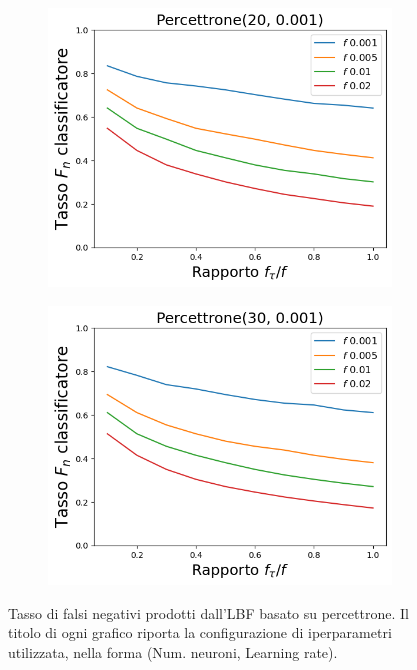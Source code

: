 \documentclass[../../main.tex]{subfiles}
\begin{document}
    \begin{figure}[H]
        \centering
        \begin{subfigure}[b]{0.49\textwidth}
            \centering
            \includegraphics[width = \textwidth]{immagini/7/LBF/Percettrone(20, 0.001)_FNR.png}
            \caption{}
            \label{fig:LBFFNRPercettrone20}
        \end{subfigure}
        \begin{subfigure}[b]{0.49\textwidth}
            \centering
            \includegraphics[width = \textwidth]{immagini/7/LBF/Percettrone(30, 0.001)_FNR.png}
            \caption{}
            \label{fig:LBFFNRPercettrone30}
        \end{subfigure}
        \caption{Tasso di falsi negativi prodotti dall'LBF basato su percettrone. Il titolo di ogni grafico riporta la configurazione di iperparametri utilizzata, nella forma (Num. neuroni, Learning rate).}
        \label{fig:LBFFNRPercettrone}
    \end{figure}
\end{document}
